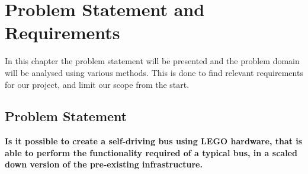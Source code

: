 \chapter{Problem Statement and Requirements}



In this chapter the problem statement will be presented and the problem domain will be analysed using various methods. This is done to find relevant requirements for our project, and limit our scope from the start. 

\section{Problem Statement}
\textbf{Is it possible to create a self-driving bus using LEGO hardware, that is able to perform the functionality required of a typical bus, in a scaled down version of the pre-existing infrastructure.}
